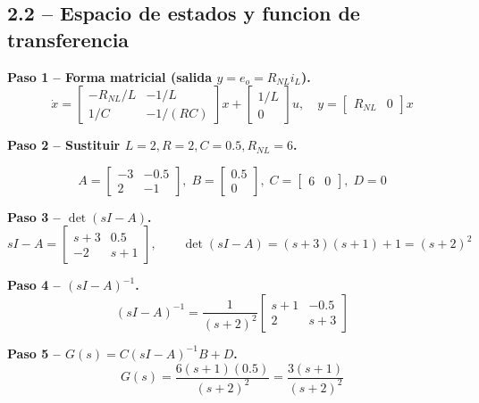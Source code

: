 \documentclass[11pt]{article}
\begin{document}
\subsection{2.2 -- Espacio de estados y funcion de transferencia}

\textbf{Paso 1 -- Forma matricial (salida $y=e_o=R_{NL}i_L$).}
\begin{equation}
\dot x = \begin{bmatrix}-R_{NL}/L & -1/L\\ 1/C & -1/(RC)\end{bmatrix}x
+\begin{bmatrix}1/L\\0\end{bmatrix}u,\quad
y=\begin{bmatrix}R_{NL}&0\end{bmatrix}x
\end{equation}

\textbf{Paso 2 -- Sustituir $L=2,R=2,C=0.5,R_{NL}=6$.}
\begin{resultbox}
\begin{equation}
A=\begin{bmatrix}-3&-0.5\\2&-1\end{bmatrix},\;
B=\begin{bmatrix}0.5\\0\end{bmatrix},\;
C=\begin{bmatrix}6&0\end{bmatrix},\; D=0
\label{eq:sys2-abcd}
\end{equation}
\end{resultbox}

\textbf{Paso 3 -- $\det(sI-A)$.}
\begin{equation}
sI-A=\begin{bmatrix}s+3&0.5\\-2&s+1\end{bmatrix},\qquad
\det(sI-A)=(s+3)(s+1)+1=(s+2)^2
\end{equation}

\textbf{Paso 4 -- $(sI-A)^{-1}$.}
\begin{equation}
(sI-A)^{-1}=\frac{1}{(s+2)^2}\begin{bmatrix}s+1&-0.5\\2&s+3\end{bmatrix}
\end{equation}

\textbf{Paso 5 -- $G(s)=C(sI-A)^{-1}B+D$.}
\begin{equation}
G(s)=\frac{6(s+1)(0.5)}{(s+2)^2}=\frac{3(s+1)}{(s+2)^2}
\end{equation}
\end{document}
